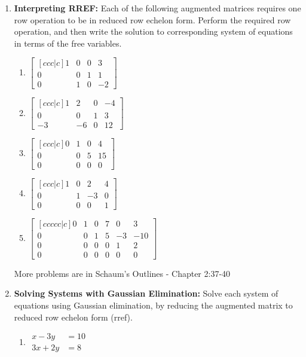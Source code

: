 \begin{enumerate}
\item \textbf{Interpreting RREF:} Each of the following augmented matrices requires one row operation to be in reduced row echelon form. Perform the required row operation, and then write the solution to corresponding system of equations in terms of the free variables.
\begin{multicols}{3}
\begin{enumerate}
	\item 
$
\begin{bmatrix}[ccc|c]
 1 & 0 & 0 & 3 \\
 0 & 0 & 1 & 1 \\
 0 & 1 & 0 & -2
\end{bmatrix}
$
	\item 
$
\begin{bmatrix}[ccc|c]
 1 & 2 & 0 & -4 \\
 0 & 0 & 1 & 3 \\
 -3 & -6 & 0 & 12
\end{bmatrix}
$
	\item 
$
\begin{bmatrix}[ccc|c]
 0 & 1 & 0 & 4 \\
 0 & 0 & 5 & 15 \\
 0 & 0 & 0 & 0
\end{bmatrix}
$
	\item 
$
\begin{bmatrix}[ccc|c]
 1 & 0 & 2 & 4 \\
 0 & 1 & -3 & 0 \\
 0 & 0 & 0 & 1
\end{bmatrix}
$
	\item 
$
\begin{bmatrix}[ccccc|c]
 0 & 1 & 0 & 7 & 0 & 3 \\
 0 & 0 & 1 & 5 & -3 & -10 \\
 0 & 0 & 0 & 0 & 1 & 2 \\
 0 & 0 & 0 & 0 & 0 & 0
\end{bmatrix}
$
\end{enumerate}
\end{multicols}

More problems are in Schaum's Outlines - 
Chapter 2:37-40


\item \textbf{Solving Systems with Gaussian Elimination:} Solve each system of equations using Gaussian elimination, by reducing the augmented matrix to reduced row echelon form (rref).
\begin{multicols}{3}
\begin{enumerate}
	\item 
$
\begin{array}{rl}
 x  -3y &= 10 \\
 3x +2y &= 8
\end{array}
$



\end{enumerate}
\end{multicols}
\end{enumerate}
